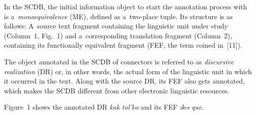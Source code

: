 \begin{multicols}{2}
  In the SCDB, the initial information object to start the annotation process with is 
a~\textit{monoequivalence} (ME), defined as a~two-place tuple. Its structure is as 
follows: A~source text fragment containing the linguistic unit under study 
(Column~1, Fig.~1) and a~corresponding translation fragment (Column~2), 
containing its functionally equivalent fragment (FEF, the term coined in~[11]).
  
  The object annotated in the SCDB of connectors is referred to as 
\textit{discursive realization} (DR) or, in other words, the actual form of the 
linguistic unit in which it occurred in the text. Along with the source DR, its FEF 
also gets annotated, which makes the SCDB different from other electronic 
linguistic resources.
  
  Figure~1 shows the annotated DR \textit{kak tol'ko} and its FEF 
\textit{d$\grave{\mbox{e}}$s que}.

\end{multicols}

\begin{figure*}[h] %
 \vspace*{14pt}
\begin{center}
\mbox{%
\epsfxsize=162.574mm
}
\end{center}
\vspace*{-11pt}
\vspace*{-14pt}
\end{figure*}

